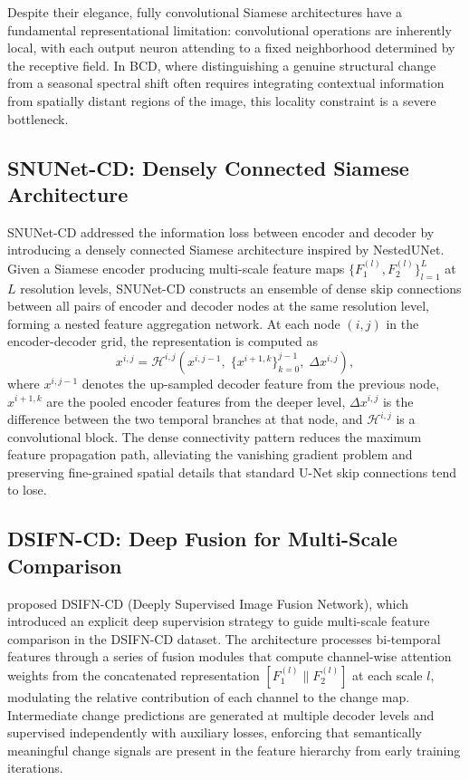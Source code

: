 Despite their elegance, fully convolutional Siamese architectures have a
fundamental representational limitation: convolutional operations are
inherently local, with each output neuron attending to a fixed neighborhood
determined by the receptive field. In BCD, where distinguishing a genuine
structural change from a seasonal spectral shift often requires integrating
contextual information from spatially distant regions of the image, this
locality constraint is a severe bottleneck.

\subsection{SNUNet-CD: Densely Connected Siamese Architecture}

SNUNet-CD \cite{Fang2021SNUNetCD} addressed the information loss between
encoder and decoder by introducing a densely connected Siamese architecture
inspired by NestedUNet. Given a Siamese encoder producing multi-scale feature
maps $\{F_1^{(l)}, F_2^{(l)}\}_{l=1}^{L}$ at $L$ resolution levels, SNUNet-CD
constructs an ensemble of dense skip connections between all pairs of encoder
and decoder nodes at the same resolution level, forming a nested feature
aggregation network. At each node $(i, j)$ in the encoder-decoder grid,
the representation is computed as
\begin{equation}
x^{i,j} = \mathcal{H}^{i,j}\!\left(
    x^{i,j-1},\;
    \bigl\{ x^{i+1, k} \bigr\}_{k=0}^{j-1},\;
    \Delta x^{i,j}
\right),
\label{eq:snunet}
\end{equation}
where $x^{i,j-1}$ denotes the up-sampled decoder feature from the previous
node, $x^{i+1, k}$ are the pooled encoder features from the deeper level,
$\Delta x^{i,j}$ is the difference between the two temporal branches at that
node, and $\mathcal{H}^{i,j}$ is a convolutional block. The dense connectivity
pattern reduces the maximum feature propagation path, alleviating the vanishing
gradient problem and preserving fine-grained spatial details that standard
U-Net skip connections tend to lose.

\subsection{DSIFN-CD: Deep Fusion for Multi-Scale Comparison}

\cite{Zhang2020FusionNetDSIFN} proposed DSIFN-CD (Deeply Supervised Image
Fusion Network), which introduced an explicit deep supervision strategy to
guide multi-scale feature comparison in the DSIFN-CD dataset. The architecture
processes bi-temporal features through a series of fusion modules that compute
channel-wise attention weights from the concatenated representation
$[F_1^{(l)} \| F_2^{(l)}]$ at each scale $l$, modulating the relative
contribution of each channel to the change map. Intermediate change predictions
are generated at multiple decoder levels and supervised independently with
auxiliary losses, enforcing that semantically meaningful change signals are
present in the feature hierarchy from early training iterations.


